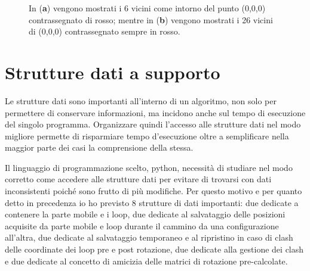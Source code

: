 \begin{figure}[H]
	\centering
	\caption{In (\textbf{a}) vengono mostrati i 6 vicini come intorno del punto (0,0,0) contrassegnato di rosso; mentre in (\textbf{b}) vengono mostrati i 26 vicini di (0,0,0) contrassegnato sempre in rosso.}
	\label{fig:Transizioni}
\end{figure}

\section{Strutture dati a supporto}\label{sec:Strutturedati}
Le strutture dati sono importanti all'interno di un algoritmo, non solo per permettere di conservare informazioni, ma incidono anche sul tempo di esecuzione del singolo programma. Organizzare quindi l'accesso alle strutture dati nel modo migliore permette di risparmiare tempo d'esecuzione oltre a semplificare nella maggior parte dei casi la comprensione della stessa. 

Il linguaggio di programmazione scelto, python, necessità di studiare nel modo corretto come accedere alle strutture dati per evitare di trovarsi con dati inconsistenti poiché sono frutto di più modifiche. Per questo motivo e per quanto detto in precedenza io ho previsto 8 strutture di dati importanti: due dedicate a contenere la parte mobile e i loop, due dedicate al salvataggio delle posizioni acquisite da parte mobile e loop durante il cammino da una configurazione all'altra, due dedicate al salvataggio temporaneo e al ripristino in caso di clash delle coordinate dei loop pre e post rotazione, due dedicate alla gestione dei clash e due dedicate al concetto di amicizia delle matrici di rotazione pre-calcolate.


